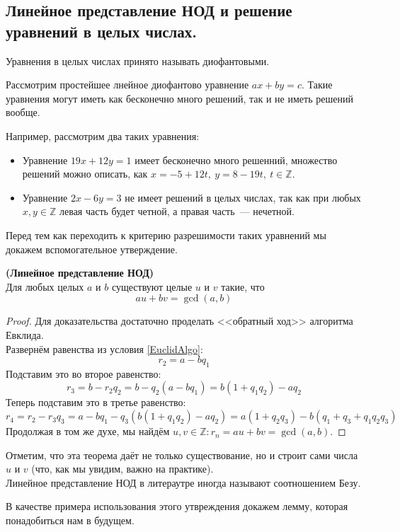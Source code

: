 \documentclass[11pt]{article}
\begin{document}
\subsection{Линейное представление НОД и решение уравнений в целых числах.}

	\begin{definition}
		Уравнения в целых числах принято называть диофантовыми.
	\end{definition}

	Рассмотрим простейшее лнейное диофантово уравнение $ax + by = c$. Такие уравнения могут иметь как бесконечно много решений, так и не иметь
	решений вообще.
	\begin{example} Например, рассмотрим два таких уравнения:
		\begin{itemize}

			\item Уравнение $19x + 12y = 1$ имеет бесконечно много решенний, множество решений можно описать, как $x = -5 + 12t, \ y = 8 - 19t, \ t \in \mathbb{Z}$.\\

			\item Уравнение $2x - 6y = 3$ не имеет решений в целых числах, так как при любых $x, y \in \mathbb{Z}$ левая часть будет четной, а правая часть~--- нечетной.

		\end{itemize}
	\end{example}

	Перед тем как переходить к критерию разрешимости таких уравнений мы докажем  вспомогательное утверждение.

	\begin{theorem} \textbf{(Линейное представление НОД)}\label{LinearGCD}\\
		Для любых целых $a$ и $b$ существуют целые $u$ и $v$ такие, что
		\[ au + bv = \gcd(a, b) \]
	\end{theorem}
	\begin{proof}
	    Для доказательства достаточно проделать <<обратный ход>> алгоритма Евклида. \\
		Развернём равенства из условия \ref{EuclidAlgo}:
		\[ r_2 = a - bq_1\]
		Подставим это во второе равенство:
		\[ r_3 = b - r_2 q_2 = b - q_2(a - bq_1) = b(1 + q_1 q_2) - a q_2 \]
		Теперь подставим это в третье равенство:
		\[ r_4 = r_2 - r_3 q_3 = a - bq_1 -  q_3(b(1 + q_1 q_2) - a q_2) = a(1 + q_2 q_3) - b(q_1 + q_3 + q_1 q_2 q_3) \]
		Продолжая в том же духе, мы найдём $u, v \in \mathbb{Z}\colon r_n = au + bv = \gcd(a, b)$.
	\end{proof}
	\begin{remark}
	    Отметим, что эта теорема даёт не только существование, но и строит сами числа $u$ и $v$ (что, как мы увидим, важно
		на практике).\\
		Линейное представление НОД в литераутре иногда называют соотношением Безу.
	\end{remark}
	В качестве примера использования этого утвреждения докажем лемму, которая понадобиться нам в будущем.
\end{document}
